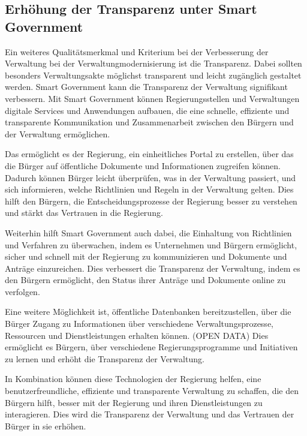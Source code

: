 \subsection{Erhöhung der Transparenz unter Smart Government}
Ein weiteres Qualitätsmerkmal und Kriterium bei der Verbesserung der Verwaltung bei der Verwaltungmodernisierung ist die Transparenz.
Dabei sollten besonders Verwaltungsakte möglichst transparent und leicht zugänglich gestaltet werden.
Smart Government kann die Transparenz der Verwaltung signifikant verbessern. 
Mit Smart Government können Regierungsstellen und Verwaltungen digitale Services und Anwendungen aufbauen, die eine schnelle, effiziente und transparente Kommunikation und Zusammenarbeit zwischen den Bürgern und der Verwaltung ermöglichen. 
\par
Das ermöglicht es der Regierung, ein einheitliches Portal zu erstellen, über das die Bürger auf öffentliche Dokumente und Informationen zugreifen können. 
Dadurch können Bürger leicht überprüfen, was in der Verwaltung passiert, und sich informieren, welche Richtlinien und Regeln in der Verwaltung gelten. 
Dies hilft den Bürgern, die Entscheidungsprozesse der Regierung besser zu verstehen und stärkt das Vertrauen in die Regierung.
\par
Weiterhin hilft Smart Government auch dabei, die Einhaltung von Richtlinien und Verfahren zu überwachen, indem es Unternehmen und Bürgern ermöglicht, sicher und schnell mit der Regierung zu kommunizieren und Dokumente und Anträge einzureichen. 
Dies verbessert die Transparenz der Verwaltung, indem es den Bürgern ermöglicht, den Status ihrer Anträge und Dokumente online zu verfolgen.
\par
Eine weitere Möglichkeit ist, öffentliche Datenbanken bereitzustellen, über die Bürger Zugang zu Informationen über verschiedene Verwaltungsprozesse, Ressourcen und Dienstleistungen erhalten können. (OPEN DATA)
Dies ermöglicht es Bürgern, über verschiedene Regierungsprogramme und Initiativen zu lernen und erhöht die Transparenz der Verwaltung.
\par
In Kombination können diese Technologien der Regierung helfen, eine benutzerfreundliche, effiziente und transparente Verwaltung zu schaffen, die den Bürgern hilft, besser mit der Regierung und ihren Dienstleistungen zu interagieren. 
Dies wird die Transparenz der Verwaltung und das Vertrauen der Bürger in sie erhöhen.